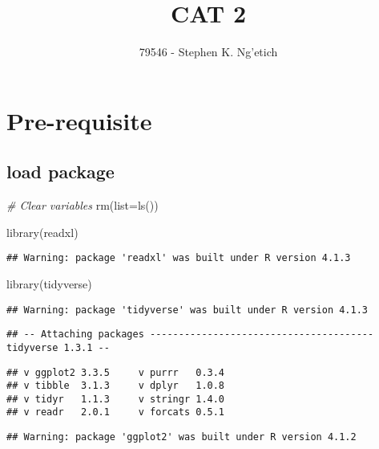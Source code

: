 \documentclass[
]{article}
\title{CAT 2}
\author{79546 - Stephen K. Ng'etich}
\date{}
\newenvironment{Shaded}{\begin{snugshade}}{\end{snugshade}}
\newcommand{\AttributeTok}[1]{\textcolor[rgb]{0.77,0.63,0.00}{#1}}
\newcommand{\CommentTok}[1]{\textcolor[rgb]{0.56,0.35,0.01}{\textit{#1}}}
\newcommand{\FunctionTok}[1]{\textcolor[rgb]{0.00,0.00,0.00}{#1}}
\newcommand{\NormalTok}[1]{#1}
\begin{document}
\maketitle

{
\setcounter{tocdepth}{3}
\tableofcontents
}
\hypertarget{pre-requisite}{%
\section{Pre-requisite}\label{pre-requisite}}

\hypertarget{load-package}{%
\subsection{load package}\label{load-package}}

\begin{Shaded}
\begin{Highlighting}[]
\CommentTok{\# Clear variables}
\FunctionTok{rm}\NormalTok{(}\AttributeTok{list=}\FunctionTok{ls}\NormalTok{())}

\FunctionTok{library}\NormalTok{(readxl)}
\end{Highlighting}
\end{Shaded}

\begin{verbatim}
## Warning: package 'readxl' was built under R version 4.1.3
\end{verbatim}

\begin{Shaded}
\begin{Highlighting}[]
\FunctionTok{library}\NormalTok{(tidyverse)}
\end{Highlighting}
\end{Shaded}

\begin{verbatim}
## Warning: package 'tidyverse' was built under R version 4.1.3
\end{verbatim}

\begin{verbatim}
## -- Attaching packages --------------------------------------- tidyverse 1.3.1 --
\end{verbatim}

\begin{verbatim}
## v ggplot2 3.3.5     v purrr   0.3.4
## v tibble  3.1.3     v dplyr   1.0.8
## v tidyr   1.1.3     v stringr 1.4.0
## v readr   2.0.1     v forcats 0.5.1
\end{verbatim}

\begin{verbatim}
## Warning: package 'ggplot2' was built under R version 4.1.2
\end{verbatim}
\end{document}
